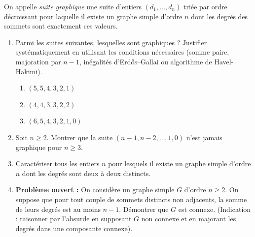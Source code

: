 \documentclass[11pt]{article}
\begin{document}
\begin{exercice}
On appelle \textit{suite graphique} une suite d'entiers $(d_1, \dots, d_n)$ triée par ordre décroissant pour laquelle il existe un graphe simple d'ordre $n$ dont les degrés des sommets sont exactement ces valeurs.
\begin{enumerate}
    \item Parmi les suites suivantes, lesquelles sont graphiques ? Justifier systématiquement en utilisant les conditions nécessaires (somme paire, majoration par $n-1$, inégalités d'Erdős–Gallai ou algorithme de Havel-Hakimi).
    \begin{enumerate}
        \item $(5, 5, 4, 3, 2, 1)$
        \item $(4, 4, 3, 3, 2, 2)$
        \item $(6, 5, 4, 3, 2, 1, 0)$
    \end{enumerate}
    \item Soit $n \ge 2$. Montrer que la suite $(n-1, n-2, \dots, 1, 0)$ n'est jamais graphique pour $n \ge 3$.
    \item Caractériser tous les entiers $n$ pour lesquels il existe un graphe simple d'ordre $n$ dont les degrés sont deux à deux distincts.
    \item \textbf{Problème ouvert :} On considère un graphe simple $G$ d'ordre $n \ge 2$. On suppose que pour tout couple de sommets distincts non adjacents, la somme de leurs degrés est au moins $n-1$. Démontrer que $G$ est connexe. (Indication : raisonner par l'absurde en supposant $G$ non connexe et en majorant les degrés dans une composante connexe).
\end{enumerate}
\end{exercice}
\end{document}
